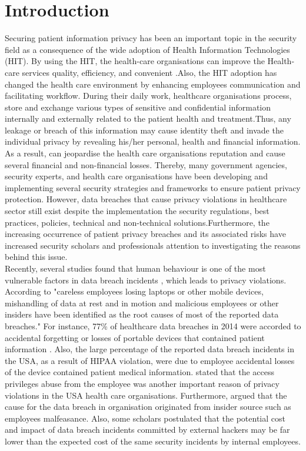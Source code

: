 \section{Introduction}
Securing patient information privacy has been an important topic in the security field as a consequence of the wide adoption of Health Information Technologies (HIT). By using the HIT, the health-care organisations can improve the Health-care services quality, efficiency, and convenient \cite{Yang2015}.Also, the HIT adoption has changed the health care environment by enhancing employees communication and facilitating workflow. During their daily work, healthcare organisations process, store and exchange various types of sensitive and confidential information internally and externally related to the patient health and treatment.Thus, any leakage or breach of this information may cause identity theft and invade the individual privacy by revealing his/her personal, health and financial information. As a result, can jeopardise the health care organisations reputation and cause several financial and non-financial losses. Thereby, many government agencies, security experts, and health care organisations have been developing and implementing several security strategies and frameworks to ensure patient privacy protection.
However, data breaches that cause privacy violations in healthcare sector still exist despite the implementation the security regulations, best practices, policies, technical and non-technical solutions\cite{Kamoun}.Furthermore, the increasing occurrence of patient privacy breaches and its associated risks have increased security scholars and professionals attention to investigating the reasons behind this issue.\\
Recently, several studies found that human behaviour is one of the most vulnerable factors in data breach incidents , which leads to privacy violations. According to \cite{Kamoun} "careless employees losing laptops or other mobile devices, mishandling of data at rest and in motion and malicious employees or other insiders have been identified as the root causes of most of the reported data breaches." For instance, 77\% of healthcare data breaches in 2014 were accorded to accidental forgetting or losses of portable devices that contained patient information \cite {Smith2016}. Also, the large percentage of the reported data breach incidents in the USA, as a result of HIPAA violation, were due to employee accidental losses of the device contained patient medical information\cite {Smith2016}. \citet{Hedstrom2013} stated that the access privileges abuse from the employee was another important reason of privacy violations in the USA health care organisations. Furthermore, \citet{Chen2015} argued that the cause for the data breach in organisation originated from insider source such as employees malfeasance. Also, some scholars postulated that the potential cost and impact of data breach incidents committed by external hackers may be far lower than the expected cost of the same security incidents by internal employees\cite{Smith2016,Wright2013}.\\
